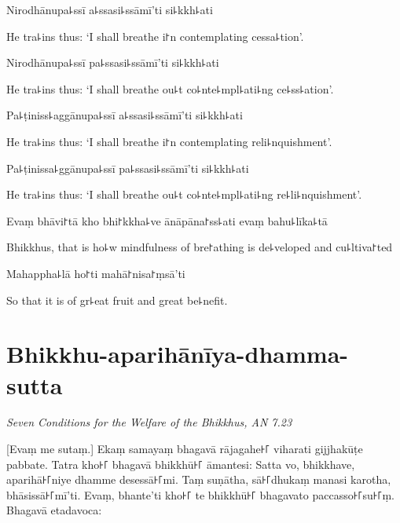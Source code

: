 Nirodhānupa꜕ssī a꜕ssasi꜕ssāmī'ti si꜕kkh꜕ati

\begin{english}
  He tra꜕ins thus: `I shall breathe i꜓n contemplating cessa꜕tion'.
\end{english}

Nirodhānupa꜕ssī pa꜕ssasi꜕ssāmī'ti si꜕kkh꜕ati

\begin{english}
  He tra꜕ins thus: `I shall breathe ou꜕t co꜕nte꜕mpl꜕ati꜕ng ce꜕ss꜕ation'.
\end{english}

Pa꜕ṭiniss꜕aggānupa꜕ssī a꜕ssasi꜕ssāmī'ti si꜕kkh꜕ati

\begin{english}
  He tra꜕ins thus: `I shall breathe i꜓n contemplating reli꜕nquishment'.
\end{english}

Pa꜕ṭinissa꜕ggānupa꜕ssī pa꜕ssasi꜕ssāmī'ti si꜕kkh꜕ati

\begin{english}
  He tra꜕ins thus: `I shall breathe ou꜕t co꜕nte꜕mpl꜕ati꜕ng re꜕li꜕nquishment'.
\end{english}

Evaṃ bhāvi꜓tā kho bhi꜓kkha꜕ve ānāpāna꜓ss꜕ati evaṃ bahu꜕līka꜕tā

\begin{english}
  Bhikkhus, that is ho꜕w mindfulness of bre꜓athing is de꜕veloped and cu꜕ltiva꜓ted
\end{english}

Mahappha꜕lā ho꜓ti mahā꜓nisa꜓ṃsā'ti

\begin{english}
  So that it is of gr꜕eat fruit and great be꜕nefit.
\end{english}


\chapter[Aparihānīya-dhamma-sutta]{Bhikkhu-aparihānīya-dhamma-sutta}

\emph{Seven Conditions for the Welfare of the Bhikkhus, AN 7.23}

\begin{leader}
\end{leader}

[Evaṃ me sutaṃ.] Ekaṃ samayaṃ bhagavā rājagahe꜔꜒ viharati gijjhakūṭe pabbate.
Tatra kho꜔꜒ bhagavā bhikkhū꜔꜒ āmantesi: Satta vo, bhikkhave, aparihā꜔꜒niye dhamme
desessā꜔꜒mi. Taṃ suṇātha, sā꜔꜒dhukaṃ manasi karotha, bhāsissā꜔꜒mī'ti. Evaṃ, bhante'ti
kho꜔꜒ te bhikkhū꜔꜒ bhagavato paccasso꜔꜒su꜔꜒ṃ. Bhagavā etadavoca:

